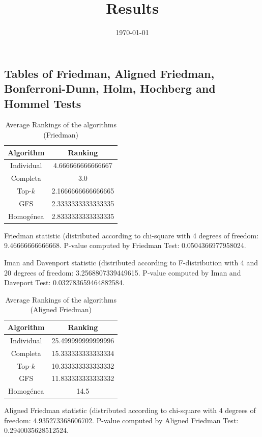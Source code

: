 \documentclass[a4paper,10pt]{article}
\title{Results}
\author{}
\date{\today}
\begin{document}
\begin{landscape}
\oddsidemargin 0in \topmargin 0in\maketitle
\section{Tables of Friedman, Aligned Friedman, Bonferroni-Dunn, Holm, Hochberg and Hommel Tests}
\begin{table}[!htp]
\centering
\caption{Average Rankings of the algorithms (Friedman)
}\begin{tabular}{c|c}
Algorithm&Ranking\\
\hline
Individual&4.666666666666667\\
Completa&3.0\\
Top-$k$&2.1666666666666665\\
GFS&2.3333333333333335\\
Homogénea&2.8333333333333335\\
\end{tabular}
\end{table}


Friedman statistic (distributed according to chi-square with 4 degrees of freedom: 9.46666666666668. 
P-value computed by Friedman Test: 0.0504366977958024.\newline

Iman and Davenport statistic (distributed according to F-distribution with 4 and 20 degrees of freedom: 3.2568807339449615. 
P-value computed by Iman and Daveport Test: 0.032783659464882584.\newline


\newpage

\begin{table}[!htp]
\centering
\caption{Average Rankings of the algorithms (Aligned Friedman)
}\begin{tabular}{c|c}
Algorithm&Ranking\\
\hline
Individual&25.499999999999996\\
Completa&15.333333333333334\\
Top-$k$&10.333333333333332\\
GFS&11.833333333333332\\
Homogénea&14.5\\
\end{tabular}
\end{table}


Aligned Friedman statistic (distributed according to chi-square with 4 degrees of freedom: 4.935273368606702. 
P-value computed by Aligned Friedman Test: 0.2940035628512524.\newline



\end{landscape}
\end{document}
